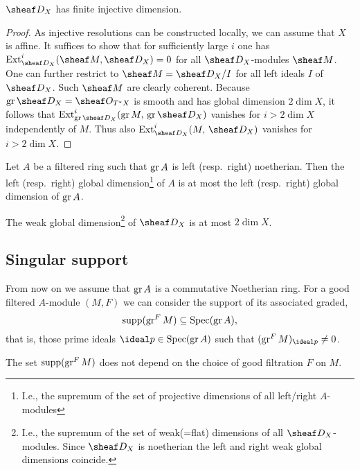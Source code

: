 \documentclass[number-in-sections,a4paper]{notes}
\begin{document}
\begin{Corollary}\label{cor:finite-inj-dim}
    $\sD_X$ has finite injective dimension.
\end{Corollary}

\begin{proof}
    As injective resolutions can be constructed locally, we can assume that $X$ is affine.
    It suffices to show that for sufficiently large $i$ one has $\Ext_{\sD_X}^i(\sheaf M, \sD_X) = 0$ for all $\sD_X$-modules $\sheaf M$.
    One can further restrict to $\sheaf M= \sD_X/I$ for all left ideals $I$ of $\sD_X$.
    Such $\sheaf M$ are clearly coherent.
    Because $\gr \sD_X = \sO_{T^*X}$ is smooth and has global dimension $2\dim X$, it follows that $\Ext_{\gr \sD_X}^i(\gr M,\, \gr\sD_X)$ vanishes for $i > 2\dim X$ independently of $M$.
    Thus also $\Ext_{\sD_X}^i(M,\,\sD_X)$ vanishes for $i > 2\dim X$.
\end{proof}

\begin{Theorem}
    Let $A$ be a filtered ring such that $\operatorname{gr} A$ is left (resp.~right) noetherian.
    Then the left (resp.~right) global dimension\footnote{I.e., the supremum of the set of projective dimensions of all left/right $A$-modules} of $A$ is at most the left (resp.~right) global dimension of $\operatorname{gr} A$.
\end{Theorem}

\begin{Corollary}
    The weak global dimension\footnote{I.e., the supremum of the set of weak(=flat) dimensions of all $\sD_X$-modules. Since $\sD_X$ is noetherian the left and right weak global dimensions coincide.} of $\sD_X$ is at most $2\dim X$.
\end{Corollary}

\subsection{Singular support}

From now on we assume that $\operatorname{gr} A$ is a commutative Noetherian ring.
For a good filtered $A$-module $(M,F)$ we can consider the support of its associated graded,
\[
    \operatorname{supp}(\operatorname{gr}^F M) \subseteq \operatorname{Spec}(\operatorname{gr} A),
\]
that is, those prime ideals $\ideal p \in \Spec(\gr A)$ such that $(\gr^F M)_{\ideal p} \ne 0$.

\begin{Lemma}
    The set $\operatorname{supp}(\operatorname{gr}^F M)$ does not depend on the choice of good filtration $F$ on $M$.
\end{Lemma}
\end{document}
